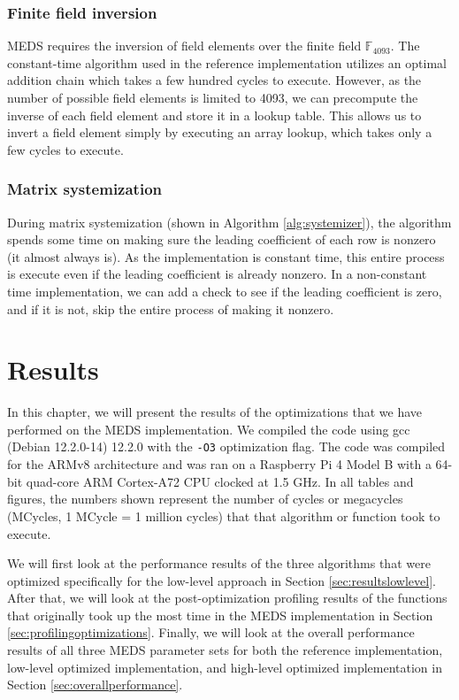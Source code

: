 \documentclass[11pt,a4paper]{report}
\theoremstyle{definition}
\begin{document}
\subsection{Finite field inversion}
MEDS requires the inversion of field elements over the finite field $\mathbb{F}_{4093}$. The constant-time algorithm used in the reference implementation utilizes an optimal addition chain which takes a few hundred cycles to execute. However, as the number of possible field elements is limited to 4093, we can precompute the inverse of each field element and store it in a lookup table. This allows us to invert a field element simply by executing an array lookup, which takes only a few cycles to execute.

\subsection{Matrix systemization}
During matrix systemization (shown in Algorithm \ref{alg:systemizer}), the algorithm spends some time on making sure the leading coefficient of each row is nonzero (it almost always is). As the implementation is constant time, this entire process is execute even if the leading coefficient is already nonzero. In a non-constant time implementation, we can add a check to see if the leading coefficient is zero, and if it is not, skip the entire process of making it nonzero.

\chapter{Results}
\label{ch:results}
In this chapter, we will present the results of the optimizations that we have performed on the MEDS implementation. We compiled the code using gcc (Debian 12.2.0-14) 12.2.0 with the \texttt{-O3} optimization flag. The code was compiled for the ARMv8 architecture and was ran on a Raspberry Pi 4 Model B with a 64-bit quad-core ARM Cortex-A72 CPU clocked at 1.5 GHz. In all tables and figures, the numbers shown represent the number of cycles or megacycles (MCycles, 1 MCycle = 1 million cycles) that that algorithm or function took to execute.

We will first look at the performance results of the three algorithms that were optimized specifically for the low-level approach in Section \ref{sec:resultslowlevel}. After that, we will look at the post-optimization profiling results of the functions that originally took up the most time in the MEDS implementation in Section \ref{sec:profilingoptimizations}. Finally, we will look at the overall performance results of all three MEDS parameter sets for both the reference implementation, low-level optimized implementation, and high-level optimized implementation in Section \ref{sec:overallperformance}.
\end{document}
